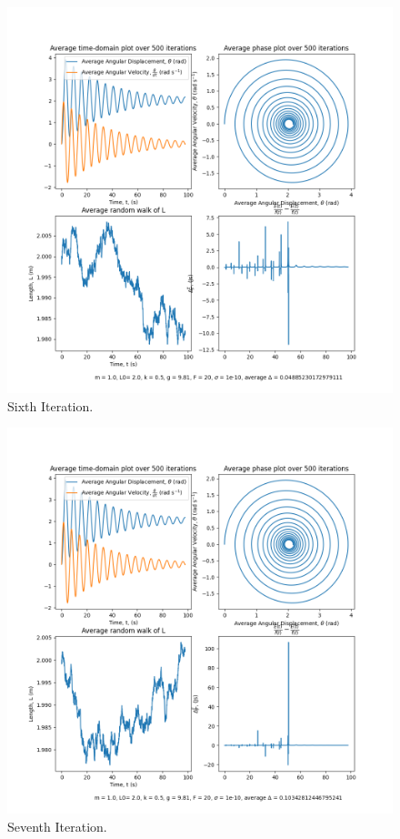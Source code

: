 \documentclass[10pt, twocolumn]{article}
\begin{document}
\begin{figure}[H]
    \centering
    \includegraphics[width = \columnwidth]{Projects/ForcedSimplePendulum/Plots/m = 1.0, L0= 2.0, k = 0.5, g = 9.81, F = 20, sigma = 1e-10, run number 5.png}
    \caption{Sixth Iteration.}
    \label{Sixth Iteration}
\end{figure}

\begin{figure}[H]
    \centering
    \includegraphics[width = \columnwidth]{Projects/ForcedSimplePendulum/Plots/m = 1.0, L0= 2.0, k = 0.5, g = 9.81, F = 20, sigma = 1e-10, run number 6.png}
    \caption{Seventh Iteration.}
    \label{Seventh Iteration}
\end{figure}
\end{document}
